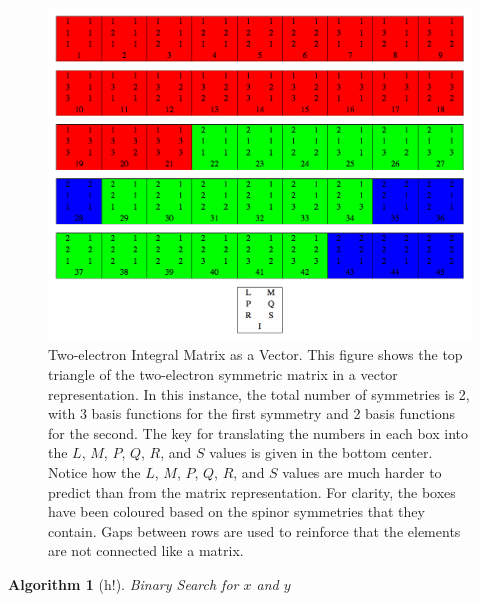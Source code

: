\documentclass[12pt]{report}
\newtheorem{algorithm}[theorem]{Algorithm}
\begin{document}
\begin{figure}[h!]
\includegraphics[width=1\textwidth]{Figures/eint2_vec.png}
\caption[Two-electron Integral Matrix as a Vector]
{Two-electron Integral Matrix as a Vector. This figure shows the top triangle of the two-electron symmetric matrix in a vector representation. In this instance, the total number of symmetries is 2, with 3 basis functions for the first symmetry and 2 basis functions for the second. The key for translating the numbers in each box into the $L$, $M$, $P$, $Q$, $R$, and $S$ values is given in the bottom center. Notice how the $L$, $M$, $P$, $Q$, $R$, and $S$ values are much harder to predict than from the matrix representation. For clarity, the boxes have been coloured based on the spinor symmetries that they contain. Gaps between rows are used to reinforce that the elements are not connected like a matrix.}
\label{fig:eint2vec}
\end{figure}


\begin{algorithm}[h!]
\caption{Binary Search for $x$ and $y$}
\label{bsxy}
\begin{algorithmic}

\ENDIF


		\ENDIF
	\ENDWHILE
\ENDIF

\end{algorithmic}
\end{algorithm}
\end{document}
